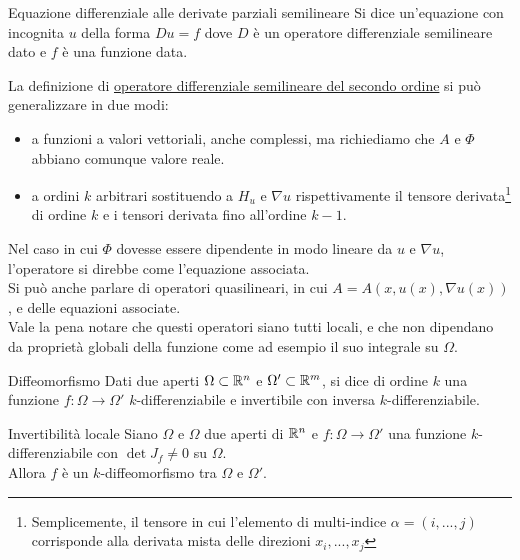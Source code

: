 \documentclass{book}
\begin{document}
\begin{definition}{Equazione differenziale alle derivate parziali semilineare}{}
    Si dice  un'equazione con incognita $u$ della forma $Du = f$ dove $D$ è un operatore differenziale semilineare dato e $f$ è una funzione data.
\end{definition}

\begin{remark}{}{}
    La definizione di \href{def:ODS2}{operatore differenziale semilineare del secondo ordine} si può generalizzare in due modi:\begin{itemize}
        \item a funzioni a valori vettoriali, anche complessi, ma richiediamo che $A$ e $\Phi$ abbiano comunque valore reale.
        \item a ordini $k$ arbitrari sostituendo a $H_u$ e $\nabla u$  rispettivamente il tensore derivata\footnote{Semplicemente, il tensore in cui l'elemento di multi-indice $\alpha = (i,...,j)$ corrisponde alla derivata mista delle direzioni $x_i,...,x_j$} di ordine $k$ e i tensori derivata fino all'ordine $k-1$.
    \end{itemize}
    Nel caso in cui $\Phi$ dovesse essere dipendente in modo lineare da $u$ e $\nabla u$, l'operatore si direbbe  come l'equazione associata.\\
    Si può anche parlare di operatori quasilineari, in cui $A = A(x,u(x),\nabla u(x))$, e delle equazioni associate.\\
    Vale la pena notare che questi operatori siano tutti locali, e che non dipendano da proprietà globali della funzione come ad esempio il suo integrale su $\Omega$.
\end{remark}

\begin{definition}{Diffeomorfismo}{}
    Dati due aperti $\Omega\subset \mathbb{R}^n$ e $\Omega'\subset \mathbb{R}^m$, si dice  di ordine $k$ una funzione $f:\Omega \to \Omega'$ $k$-differenziabile e invertibile con inversa $k$-differenziabile.
\end{definition}

\begin{theorem}{Invertibilità locale}{}
    Siano $\Omega$ e $\Omega$ due aperti di $\mathbb{R}^n$ e $f:\Omega\to\Omega'$ una funzione $k$-differenziabile con $\det J_f \neq 0$ su $\Omega$.\\
    Allora $f$ è un $k$-diffeomorfismo tra $\Omega$ e $\Omega'$.
\end{theorem}
\end{document}
